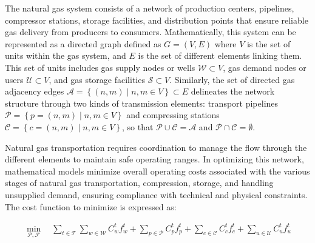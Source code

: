 The natural gas system consists of a network of production centers, pipelines, compressor stations, storage facilities, and distribution points that ensure reliable gas delivery from producers to consumers. Mathematically, this system can be represented as a directed graph defined as $ G = (V, E)$ where $V$ is the set of units within the gas system, and $E$ is the set of different elements linking them. This set of units includes gas supply nodes or wells $\mathcal{W} \subset V$, gas demand nodes or users $\mathcal{U} \subset V$, and gas storage facilities $\mathcal{S} \subset V$. Similarly, the set of directed gas adjacency edges $\mathcal{A} = \left\{(n,m) \mid n,m\in V \right\} \subset E$ delineates the network structure through two kinds of transmission elements: transport pipelines $\mathcal{P} = \left\{p=(n,m) \mid n,m\in V \right\}$ and compressing stations $\mathcal{C} = \left\{c=(n,m) \mid n,m \in V \right\}$, so that $\mathcal{P}\cup\mathcal{C}=\mathcal{A}$ and $\mathcal{P}\cap\mathcal{C}=\emptyset$.

Natural gas transportation requires coordination to manage the flow through the different elements to maintain safe operating ranges. In optimizing this network, mathematical models minimize overall operating costs associated with the various stages of natural gas transportation, compression, storage, and handling unsupplied demand, ensuring compliance with technical and physical constraints. The cost function to minimize is expressed as:

\begin{equation} \label{eq:obj_func_linear_gas}
    \begin{split}
        \min_{\mathcal{P}, \mathcal{F}} \quad \sum_{t \in \mathcal{T}} \sum_{w \in \mathcal{W}} C_{w}^t {f_{w}^t} + \sum_{p \in \mathcal{P}} C_{p}^t {f_{p}^t} + \sum_{c \in \mathcal{C}} C_{c}^t {f_{c}^t} + \sum_{u \in \mathcal{U}} C_{u}^{t} {f_{u}^{t}} 
    \end{split}
\end{equation}


